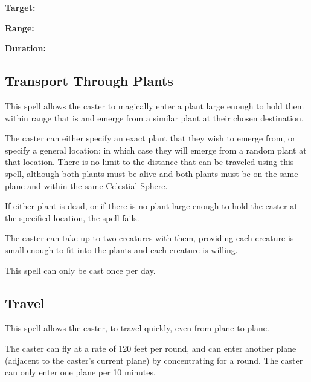 \begin{multicols*}{2}
{\textbf{Target:}

\textbf{Range:}

\textbf{Duration:} }


\subsection{Transport Through Plants}\label{spell:Transport Through Plants}

This spell allows the caster to magically enter a plant large enough to hold them within range that is and emerge from a similar plant at their chosen destination.

The caster can either specify an exact plant that they wish to emerge from, or specify a general location; in which case they will emerge from a random plant at that location. There is no limit to the distance that can be traveled using this spell, although both plants must be alive and both plants must be on the same plane and within the same Celestial Sphere.

If either plant is dead, or if there is no plant large enough to hold the caster at the specified location, the spell fails.

The caster can take up to two creatures with them, providing each creature is small enough to fit into the plants and each creature is willing.

This spell can only be cast once per day.

\subsection{Travel}\label{spell:Travel}

This spell allows the caster, to travel quickly, even from plane to plane.

The caster can fly at a rate of 120 feet per round, and can enter another plane (adjacent to the caster’s current plane) by concentrating for a round. The caster can only enter one plane per 10 minutes.


\end{multicols*}
